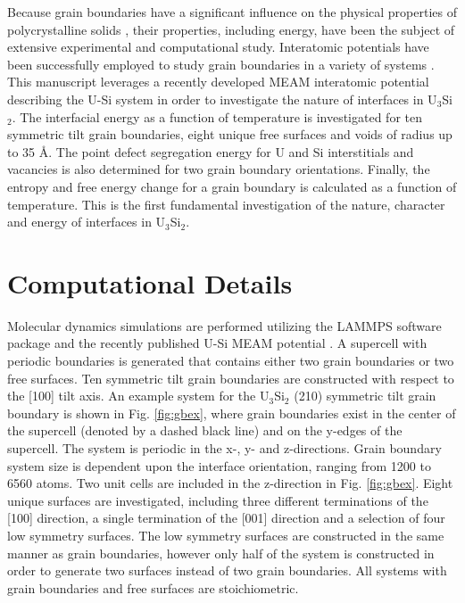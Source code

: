 \documentclass[review]{elsarticle}
\begin{document}
Because grain boundaries have a significant influence on the physical properties of polycrystalline solids \cite{brandon2010, harmer2010, zhang2016, zhang2019}, their properties, including energy, have been the subject of extensive experimental and computational study. Interatomic potentials have been successfully employed to study grain boundaries in a variety of systems \cite{morita1997, wolf1989bcc1, wolf1990bcc2, ratanaphan2015, novoselov2014, tschopp2012probing, hahn2016}. This manuscript leverages a recently developed MEAM interatomic potential describing the U-Si system in order to investigate the nature of interfaces in U$_{3}$Si$_{2}$. The interfacial energy as a function of temperature is investigated for ten symmetric tilt grain boundaries, eight unique free surfaces and voids of radius up to 35 {\AA}. The point defect segregation energy for U and Si interstitials and vacancies is also determined for two grain boundary orientations. Finally, the entropy and free energy change for a grain boundary is calculated as a function of temperature. This is the first fundamental investigation of the nature, character and energy of interfaces in U$_{3}$Si$_{2}$. 

\section{Computational Details}
Molecular dynamics simulations are performed utilizing the LAMMPS \cite{plimpton1995} software package and the recently published U-Si MEAM potential \cite{beelerUSi}. A supercell with periodic boundaries is generated that contains either two grain boundaries or two free surfaces. Ten symmetric tilt grain boundaries are constructed with respect to the [100] tilt axis. An example system for the U$_{3}$Si$_{2}$ (210) symmetric tilt grain boundary is shown in Fig. \ref{fig:gbex}, where grain boundaries exist in the center of the supercell (denoted by a dashed black line) and on the y-edges of the supercell. The system is periodic in the x-, y- and z-directions. Grain boundary system size is dependent upon the interface orientation, ranging from 1200 to 6560 atoms. Two unit cells are included in the z-direction in Fig. \ref{fig:gbex}. Eight unique surfaces are investigated, including three different terminations of the [100] direction, a single termination of the [001] direction and a selection of four low symmetry surfaces. The low symmetry surfaces are constructed in the same manner as grain boundaries, however only half of the system is constructed in order to generate two surfaces instead of two grain boundaries. All systems with grain boundaries and free surfaces are stoichiometric. 
\end{document}
